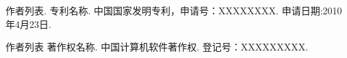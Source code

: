 \begin{patent}
\renewcommand{\currentchapter}{附录2 攻读博士学位期间申请的发明专利和其他成果}
\item 作者列表. 专利名称. 中国国家发明专利，申请号：XXXXXXXX. 申请日期:2010年4月23日.
\item 作者列表 著作权名称. 中国计算机软件著作权. 登记号：XXXXXXXXX.
\end{patent} 